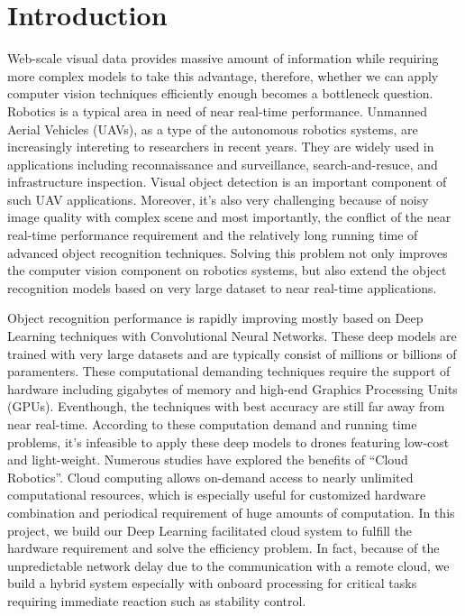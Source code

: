 \section{Introduction}
Web-scale visual data provides massive amount of information while requiring more complex models to take this advantage, therefore, whether we can apply computer vision techniques efficiently enough becomes a bottleneck question.
Robotics is a typical area in need of near real-time performance. Unmanned Aerial Vehicles (UAVs), as a type of the autonomous robotics systems, are increasingly intereting to researchers in recent years. 
They are widely used in applications including reconnaissance and surveillance, search-and-resuce, and infrastructure inspection.
Visual object detection is an important component of such UAV applications.
Moreover, it's also very challenging because of noisy image quality with complex scene and most importantly, the conflict of the near real-time performance requirement and the relatively long running time of advanced object recognition techniques.
Solving this problem not only improves the computer vision component on robotics systems, but also extend the object recognition models based on very large dataset to near real-time applications.

Object recognition performance is rapidly improving mostly based on Deep Learning techniques with Convolutional Neural Networks.
These deep models are trained with very large datasets and are typically consist of millions or billions of paramenters. These computational demanding techniques require the support of hardware including gigabytes of memory and high-end Graphics Processing Units (GPUs). Eventhough, the techniques with best accuracy are still far away from near real-time. According to these computation demand and running time problems, it's infeasible to apply these deep models to drones featuring low-cost and light-weight.
Numerous studies have explored the benefits of ``Cloud Robotics''.
Cloud computing allows on-demand access to nearly unlimited computational resources, which is especially useful for customized hardware combination and periodical requirement of huge amounts of computation. In this project, we build our Deep Learning facilitated cloud system to fulfill the hardware requirement and solve the efficiency problem. In fact, because of the unpredictable network delay due to the communication with a remote cloud, we build a hybrid system especially with onboard processing for critical tasks requiring immediate reaction such as stability control. 

